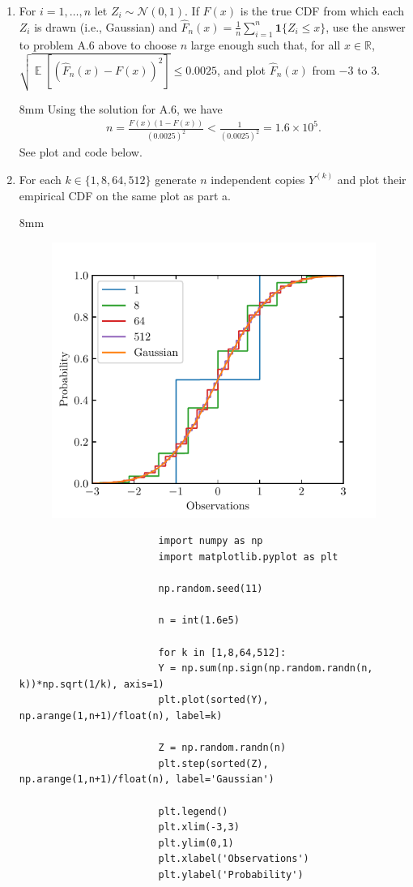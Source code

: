 \documentclass{article}
\newcommand{\vect}[1]{\boldsymbol{#1}} %
\DeclareMathOperator{\E}{\mathbb{E}}
\newenvironment{solution}{\begin{adjustwidth}{8mm}{}}{\end{adjustwidth}}
\begin{document}
\begin{enumerate}
        \item For $i=1,\dots,n$ let $Z_i \sim \mathcal{N}(0,1)$. If $F(x)$ is the true CDF from which each $Z_i$ is drawn (i.e., Gaussian) and $\hat{F}_n(x) = \frac{1}{n} \sum_{i=1}^n \vect{1}\{Z_i \leq x\}$, use the answer to problem A.6 above to choose $n$ large enough such that, for all $x \in \mathbb{R}$, $\sqrt{\E[(\hat{F}_n(x) - F(x))^2]} \leq 0.0025$, and plot $\hat{F}_n(x)$ from $-3$ to $3$.
        \begin{solution}
                Using the solution for A.6, we have
                \begin{align*}
                        n = \frac{F(x)(1-F(x))}{(0.0025)^2} < \frac{1}{(0.0025)^2} = 1.6 \times 10^5.
                \end{align*}
                See plot and code below.
        \end{solution}
        \item For each $k \in \{1,8,64,512\}$ generate $n$ independent copies $Y^{(k)}$ and plot their empirical CDF on the same plot as part a.
        \begin{solution}
                \begin{figure}[H]
                        \centering
                        \includegraphics[width=0.5\linewidth]{A12.pdf}
                \end{figure}
                \begin{verbatim}
                        import numpy as np
                        import matplotlib.pyplot as plt

                        np.random.seed(11)

                        n = int(1.6e5)

                        for k in [1,8,64,512]:
                        Y = np.sum(np.sign(np.random.randn(n, k))*np.sqrt(1/k), axis=1)
                        plt.plot(sorted(Y), np.arange(1,n+1)/float(n), label=k)
                        
                        Z = np.random.randn(n)
                        plt.step(sorted(Z), np.arange(1,n+1)/float(n), label='Gaussian')

                        plt.legend()
                        plt.xlim(-3,3)
                        plt.ylim(0,1)
                        plt.xlabel('Observations')
                        plt.ylabel('Probability')
                \end{verbatim}
        \end{solution}
\end{enumerate}
\end{document}
